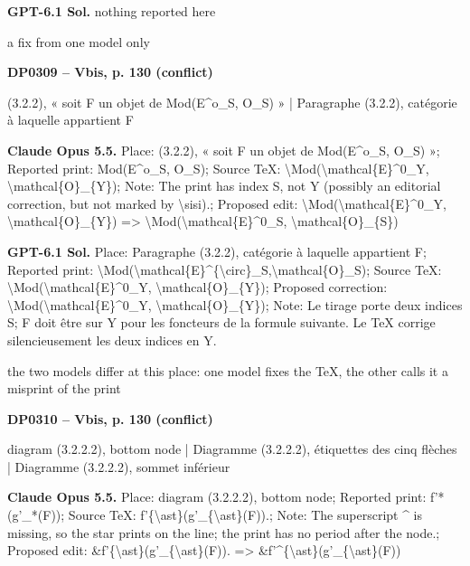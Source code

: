 \textbf{GPT-6.1 Sol.} nothing reported here\par
a fix from one model only\par
\par\noindent\hypertarget{DP0309}{}\textbf{DP0309 -- Vbis, p. 130 (conflict)}\par
(3.2.2), « soit F un objet de Mod(E\textasciicircum{}o\_S, O\_S) » | Paragraphe (3.2.2), catégorie à laquelle appartient F\par
\textbf{Claude Opus 5.5.} Place: (3.2.2), « soit F un objet de Mod(E\textasciicircum{}o\_S, O\_S) »; Reported print: Mod(E\textasciicircum{}o\_S, O\_S); Source TeX: \textbackslash{}Mod(\textbackslash{}mathcal\{E\}\textasciicircum{}0\_Y, \textbackslash{}mathcal\{O\}\_\{Y\}); Note: The print has index S, not Y (possibly an editorial correction, but not marked by \textbackslash{}sisi).; Proposed edit: \textbackslash{}Mod(\textbackslash{}mathcal\{E\}\textasciicircum{}0\_Y, \textbackslash{}mathcal\{O\}\_\{Y\}) =\allowbreak > \textbackslash{}Mod(\textbackslash{}mathcal\{E\}\textasciicircum{}0\_S, \textbackslash{}mathcal\{O\}\_\{S\})\par
\textbf{GPT-6.1 Sol.} Place: Paragraphe (3.2.2), catégorie à laquelle appartient F; Reported print: \textbackslash{}Mod(\textbackslash{}mathcal\{E\}\textasciicircum{}\{\textbackslash{}circ\}\_S,\textbackslash{}mathcal\{O\}\_S); Source TeX: \textbackslash{}Mod(\textbackslash{}mathcal\{E\}\textasciicircum{}0\_Y, \textbackslash{}mathcal\{O\}\_\{Y\}); Proposed correction: \textbackslash{}Mod(\textbackslash{}mathcal\{E\}\textasciicircum{}0\_Y, \textbackslash{}mathcal\{O\}\_\{Y\}); Note: Le tirage porte deux indices S; F doit être sur Y pour les foncteurs de la formule suivante. Le TeX corrige silencieusement les deux indices en Y.\par
the two models differ at this place: one model fixes the TeX, the other calls it a misprint of the print\par
\par\noindent\hypertarget{DP0310}{}\textbf{DP0310 -- Vbis, p. 130 (conflict)}\par
diagram (3.2.2.2), bottom node | Diagramme (3.2.2.2), étiquettes des cinq flèches | Diagramme (3.2.2.2), sommet inférieur\par
\textbf{Claude Opus 5.5.} Place: diagram (3.2.2.2), bottom node; Reported print: f'*(g'\_*(F)); Source TeX: f'\{\textbackslash{}ast\}(g'\_\{\textbackslash{}ast\}(F)).; Note: The superscript \textasciicircum{} is missing, so the star prints on the line; the print has no period after the node.; Proposed edit: \&f'\{\textbackslash{}ast\}(g'\_\{\textbackslash{}ast\}(F)). =\allowbreak > \&f'\textasciicircum{}\{\textbackslash{}ast\}(g'\_\{\textbackslash{}ast\}(F))\par
